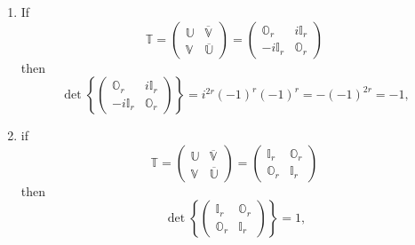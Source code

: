\documentclass[aps, preprint]{revtex4}
\begin{document}
\begin{enumerate}
\item If
\begin{equation}\mathbb{T} =\left (\begin{array}{cc}\mathbb{U} & \overline{\mathbb{V}} \\
\mathbb{V} & \overline{\mathbb{U}}\end{array}\right ) =\left (\begin{array}{cc}\mathbb{O}_{r} & i \mathbb{I}_{r} \\
 -i \mathbb{I}_{r} & \mathbb{O}_{r}\end{array}\right )
\end{equation}then
\begin{equation}\det \left \{\left (\begin{array}{cc}\mathbb{O}_{r} & i \mathbb{I}_{r} \\
 -i \mathbb{I}_{r} & \mathbb{O}_{r}\end{array}\right )\right \} =i^{2 r} \left ( -1\right )^{r} \left ( -1\right )^{r} = -\left ( -1\right )^{2 r} = -1\text{,}
\end{equation}

\item if
\begin{equation}\mathbb{T} =\left (\begin{array}{cc}\mathbb{U} & \overline{\mathbb{V}} \\
\mathbb{V} & \overline{\mathbb{U}}\end{array}\right ) =\left (\begin{array}{cc}\mathbb{I}_{r} & \mathbb{O}_{r} \\
\mathbb{O}_{r} & \mathbb{I}_{r}\end{array}\right )
\end{equation}then
\begin{equation}\det \left \{\left (\begin{array}{cc}\mathbb{I}_{r} & \mathbb{O}_{r} \\
\mathbb{O}_{r} & \mathbb{I}_{r}\end{array}\right )\right \} =1\text{,}
\end{equation}


\end{enumerate}
\end{document}
